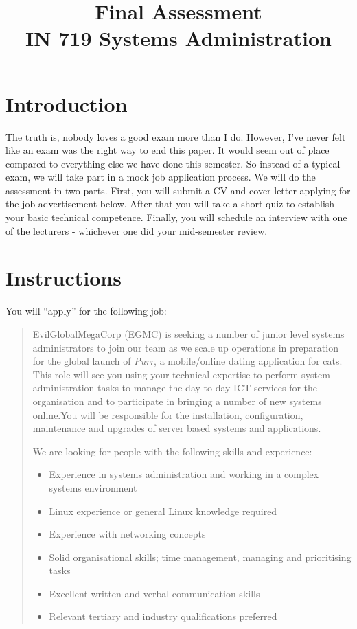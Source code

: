 \documentclass{article}   	%
\title{Final Assessment\\ IN 719  Systems Administration}
\date{}							%
\begin{document}
\maketitle

\section{Introduction}
The truth is, nobody loves a good exam more than I do. However, I've never felt like an exam was the right way to end this paper. It would seem out of place compared to everything else we have done this semester. So instead of a typical exam, we will take part in a mock job application process. We will do the assessment in two parts. First, you will submit a CV and cover letter applying for the job advertisement below. After that you will take a short quiz to establish your basic technical competence. Finally, you will schedule an interview with one of the lecturers - whichever one did your mid-semester review.

\section{Instructions}
You will ``apply'' for the following job:

\begin{quotation}
  EvilGlobalMegaCorp (EGMC) is seeking a number of junior level systems administrators to join our team as we scale up operations in preparation for the global launch of \emph{Purr}, a mobile/online dating application for cats.  This role will see you using your technical expertise to perform system administration tasks to manage the day-to-day ICT services for the organisation and to participate in bringing a number of new systems online.You will be responsible for the installation, configuration, maintenance and upgrades of server based systems and applications.
  
  We are looking for people with the following skills and experience:
  \begin{itemize}
    \item Experience in systems administration and working in a complex systems environment
    \item Linux experience or general Linux knowledge required 
    \item Experience with networking concepts
    \item Solid organisational skills; time management, managing and prioritising tasks
    \item Excellent written and verbal communication skills
    \item Relevant tertiary and industry qualifications preferred
  \end{itemize}
\end{quotation}
\end{document}
